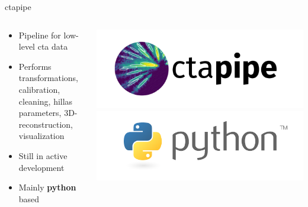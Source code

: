 \begin{frame}{ctapipe \\ \footnotesize{\cite{ctapipe}}}
    \begin{columns}[T] %
        \begin{column}{.45\textwidth}
            \vspace{10pt}
            \begin{itemize}
                \item { Pipeline for low-level cta data}
                \item { Performs transformations, calibration, cleaning,
                        hillas parameters, 3D-reconstruction, visualization}
                \item { Still in active development}
                \item { Mainly \textbf{python} based}
            \end{itemize}
        \end{column}
        \begin{column}{.48\textwidth}
            \includegraphics[width=\linewidth]{images/ctapipe_logo.png}
            \includegraphics[width=\linewidth]{images/python_logo.png}
        \end{column}
    \end{columns}
\end{frame}
